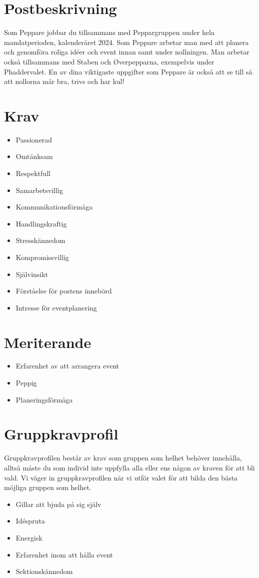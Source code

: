 \documentclass{dsekrequirementsprofile}
\begin{document}
\maketitle

\section*{Postbeskrivning}
Som Peppare jobbar du tillsammans med Peppargruppen under hela mandatperioden,
kalenderåret 2024. Som Peppare arbetar man med att planera och genomföra
roliga idéer och event innan samt under nollningen. Man arbetar också
tillsammans med Staben och Øverpepparna, exempelvis under Phaddervalet. En av
dina viktigaste uppgifter som Peppare är också att se till så att nollorna mår
bra, trivs och har kul!

\section*{Krav}
\begin{itemize}
\item Passionerad
\item Omtänksam
\item Respektfull
\item Samarbetsvillig
\item Kommunikationsförmåga
\item Handlingskraftig
\item Stresskännedom
\item Kompromissvillig
\item Självinsikt
\item Förståelse för postens innebörd
\item Intresse för eventplanering
\end{itemize}

\section*{Meriterande}
\begin{itemize}
\item Erfarenhet av att arrangera event
\item Peppig
\item Planeringsförmåga
\end{itemize}

\section*{Gruppkravprofil}      %
Gruppkravprofilen består av krav som gruppen som helhet behöver innehålla,
alltså måste du som individ inte uppfylla alla eller ens någon av kraven för att
bli vald. Vi väger in gruppkravprofilen när vi utför valet för att bilda den
bästa möjliga gruppen som helhet.

\begin{itemize}
\item Gillar att bjuda på sig själv
\item Idéspruta
\item Energisk
\item Erfarenhet inom att hålla event
\item Sektionskännedom
\end{itemize}
\end{document}
